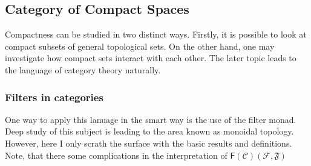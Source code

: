 \documentclass[12pt]{scrartcl}
\renewcommand{\.}{\; . \;}
\renewcommand{\C}{\mathcal{C}}
\newcommand{\FILT}{\mathsf{F}}
\newcommand{\F}{\mathcal{F}}
\begin{document}
\subsection{Category of Compact Spaces}
Compactness can be studied in two distinct ways.
Firstly, it is possible to look at compact subsets of general topological sets.
On the other hand, one  may investigate how compact sets interact with each other.
The later topic leads to the language of category theory naturally.
\subsubsection{Filters in categories}
One way to apply this lanuage in the smart way is the use of the filter monad.
Deep study of this subject is leading to the area known as monoidal topology.
However, here I only scrath the surface with the basic results and definitions.
Note, that there some complications in the interpretation of
$\FILT(\C)(\F,\mathfrak{F})$
\end{document}
